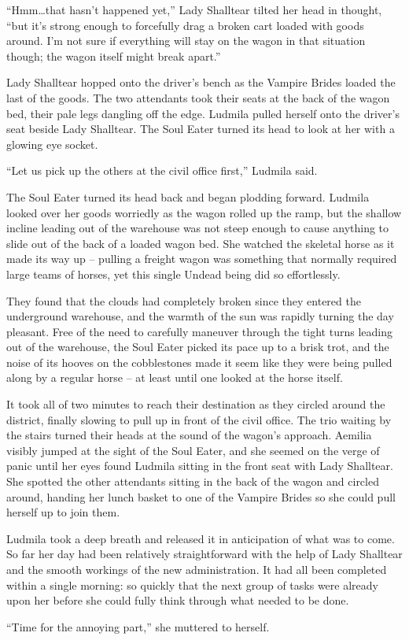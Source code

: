  

“Hmm…that hasn’t happened yet,” Lady Shalltear tilted her head in thought, “but it’s strong enough to forcefully drag a broken cart loaded with goods around. I’m not sure if everything will stay on the wagon in that situation though; the wagon itself might break apart.”

 

Lady Shalltear hopped onto the driver’s bench as the Vampire Brides loaded the last of the goods. The two attendants took their seats at the back of the wagon bed, their pale legs dangling off the edge. Ludmila pulled herself onto the driver’s seat beside Lady Shalltear. The Soul Eater turned its head to look at her with a glowing eye socket.

 

“Let us pick up the others at the civil office first,” Ludmila said.

 

The Soul Eater turned its head back and began plodding forward. Ludmila looked over her goods worriedly as the wagon rolled up the ramp, but the shallow incline leading out of the warehouse was not steep enough to cause anything to slide out of the back of a loaded wagon bed. She watched the skeletal horse as it made its way up – pulling a freight wagon was something that normally required large teams of horses, yet this single Undead being did so effortlessly.

 

They found that the clouds had completely broken since they entered the underground warehouse, and the warmth of the sun was rapidly turning the day pleasant. Free of the need to carefully maneuver through the tight turns leading out of the warehouse, the Soul Eater picked its pace up to a brisk trot, and the noise of its hooves on the cobblestones made it seem like they were being pulled along by a regular horse – at least until one looked at the horse itself.

 

It took all of two minutes to reach their destination as they circled around the district, finally slowing to pull up in front of the civil office. The trio waiting by the stairs turned their heads at the sound of the wagon’s approach. Aemilia visibly jumped at the sight of the Soul Eater, and she seemed on the verge of panic until her eyes found Ludmila sitting in the front seat with Lady Shalltear. She spotted the other attendants sitting in the back of the wagon and circled around, handing her lunch basket to one of the Vampire Brides so she could pull herself up to join them.

 

Ludmila took a deep breath and released it in anticipation of what was to come. So far her day had been relatively straightforward with the help of Lady Shalltear and the smooth workings of the new administration. It had all been completed within a single morning: so quickly that the next group of tasks were already upon her before she could fully think through what needed to be done.

 

“Time for the annoying part,” she muttered to herself.